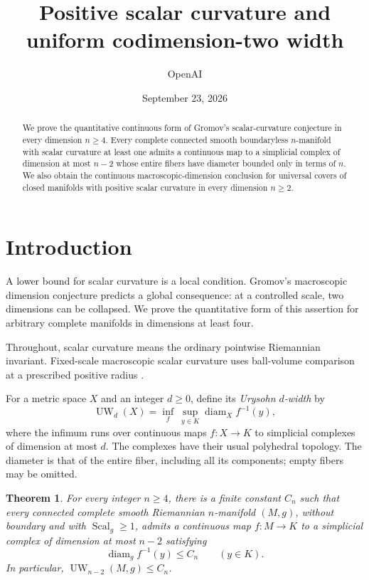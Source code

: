 \documentclass[11pt]{article}
\title{Positive scalar curvature and uniform codimension-two width}
\author{OpenAI}
\date{September 23, 2026}
\numberwithin{equation}{section}
\newtheorem{theorem}{Theorem}[section]
\theoremstyle{definition}
\theoremstyle{remark}
\begin{document}
\begin{abstract}
We prove the quantitative continuous form of Gromov's scalar-curvature
conjecture in every dimension $n\ge4$. Every complete connected smooth
boundaryless $n$-manifold with scalar curvature at least one admits a
continuous map to a simplicial complex of dimension at most $n-2$ whose
entire fibers have diameter bounded only in terms of $n$. We also obtain
the continuous macroscopic-dimension conclusion for
universal covers of closed manifolds with positive scalar curvature in
every dimension $n\ge2$.
\end{abstract}
\begingroup\small\tableofcontents\endgroup
 
\section{Introduction}\label{sec:introduction}

A lower bound for scalar curvature is a local condition. Gromov's
macroscopic dimension conjecture predicts a global consequence: at a
controlled scale, two dimensions can be collapsed. We prove the
quantitative form of this assertion for arbitrary complete manifolds
in dimensions at least four.

Throughout, scalar curvature means the ordinary pointwise Riemannian
invariant. Fixed-scale macroscopic scalar curvature uses ball-volume
comparison at a prescribed positive radius
\citep[Definitions~1.2--1.3]{kumarSen2026Width}.

For a metric space \(X\) and an integer \(d\ge0\), define its
\emph{Urysohn \(d\)-width} by
\[
 \operatorname{UW}_d(X)=\inf_f\ \sup_{y\in K}\operatorname{diam}_X f^{-1}(y),
\]
where the infimum runs over continuous maps \(f:X\to K\) to simplicial
complexes of dimension at most \(d\). The complexes have their usual
polyhedral topology. The diameter is that of the entire fiber, including
all its components; empty fibers may be omitted.

\begin{theorem}\label{thm:main}
For every integer \(n\ge4\), there is a finite constant \(C_n\) such
that every connected complete smooth Riemannian \(n\)-manifold
\((M,g)\), without boundary and with \(\operatorname{Scal}_g\ge1\), admits a
continuous map \(f:M\to K\) to a simplicial complex of dimension at
most \(n-2\) satisfying
\[
 \operatorname{diam}_g f^{-1}(y)\le C_n\qquad(y\in K).
\]
In particular, \(\operatorname{UW}_{n-2}(M,g)\le C_n\).
\end{theorem}
\end{document}
